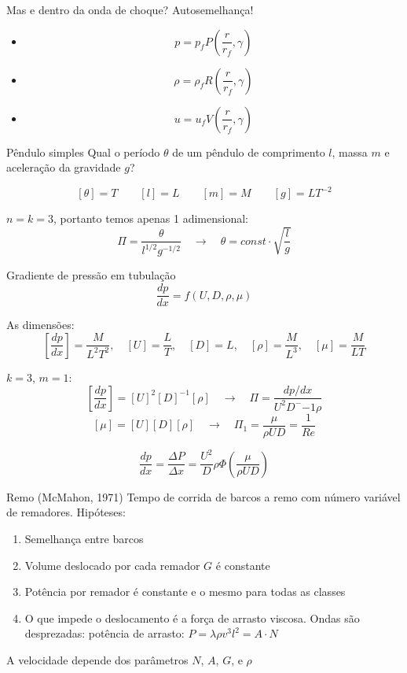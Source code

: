 \documentclass{beamer}
\newcommand{\lra}{\ensuremath{\longrightarrow}}
\newcommand{\qrq}{\ensuremath{\quad\lra\quad}}
\begin{document}
\begin{frame}{Mas e dentro da onda de choque?}
  Autosemelhança!
  \begin{itemize}
  \item \[ p = p_f P\left(\frac{r}{r_f}, \gamma\right) \]
  \item \[ \rho = \rho_f R\left(\frac{r}{r_f}, \gamma\right) \]
  \item \[ u = u_f V\left(\frac{r}{r_f}, \gamma\right) \]
\end{itemize}
\end{frame}


\begin{frame}{Pêndulo simples}
  Qual o período $\theta$ de um pêndulo de comprimento $l$, massa $m$ e aceleração da gravidade $g$?

  \[
    [\theta] = T \qquad [l] = L \qquad [m] = M \qquad [g] = LT^{-2}
  \]

  $n=k=3$, portanto temos apenas 1 adimensional:
  \[
  \Pi = \frac{\theta}{l^{1/2}g^{-1/2}} \qrq \theta = const \cdot \sqrt{\frac{l}{g}}
  \]
  
  
\end{frame}



\begin{frame}{Gradiente de pressão em tubulação}
  \[
  \frac{dp}{dx} = f(U, D, \rho, \mu)
  \]

  As dimensões:
  \[
  \left[\frac{dp}{dx}\right] = \frac{M}{L^2T^2}, \quad [U] = \frac{L}{T}, \quad [D] = L, \quad [\rho] = \frac{M}{L^3}, \quad [\mu] = \frac{M}{LT}
  \]

  $k=3$, $m=1$:
  \[
  \left[\frac{dp}{dx}\right] = [U]^2[D]^{-1}[\rho] \qrq \Pi = \frac{dp/dx}{U^2D^-{-1}\rho}
  \]
  \[
    [\mu] = [U][D][\rho] \qrq \Pi_1 = \frac{\mu}{\rho U D} = \frac{1}{Re}
    \]

    \[
    \frac{dp}{dx} = \frac{\Delta P}{\Delta x} = \frac{U^2}{D} \rho \Phi\left(\frac{\mu}{\rho U D}\right)
    \]
    
        
  
\end{frame}

\begin{frame}{Remo (McMahon, 1971)}
  Tempo de corrida de barcos a remo com número variável de remadores. Hipóteses:
  \begin{enumerate}
  \item Semelhança entre barcos
  \item Volume deslocado por cada remador $G$ é constante
  \item Potência por remador é constante e o mesmo para todas as classes
  \item O que impede o deslocamento é a força de arrasto viscosa. Ondas são desprezadas: potência de arrasto: $P = \lambda \rho v^3 l^2 = A\cdot N$
  \end{enumerate}
  A velocidade depende dos parâmetros $N$, $A$, $G$, e $\rho$
\end{frame}
\end{document}

